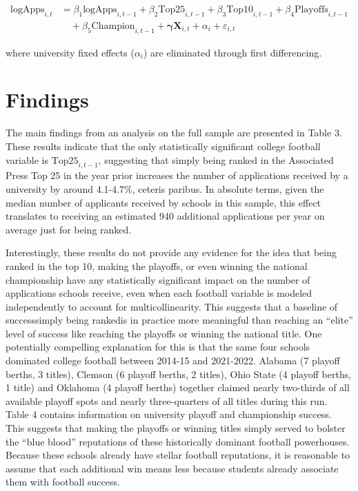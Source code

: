 \documentclass[12pt,english]{article}
\begin{document}
\begin{equation}
\begin{aligned}
    \text{logApps}_{i,t} &= \beta_1 \text{logApps}_{i,t-1} + \beta_2 \text{Top25}_{i,t-1} + \beta_3 \text{Top10}_{i,t-1} + \beta_4 \text{Playoffs}_{i,t-1} \\
    &\quad + \beta_5 \text{Champion}_{i,t-1} + \boldsymbol{\gamma}\mathbf{X}_{i,t}  + \alpha_i + \varepsilon_{i,t}
\end{aligned}
\end{equation}

where university fixed effects ($\alpha_i$) are eliminated through first differencing.

\section{Findings}

The main findings from an analysis on the full sample are presented in Table 3. These results indicate that the only statistically significant college football variable is $\text{Top25}_{i,t-1}$, suggesting that simply being ranked in the Associated Press Top 25 in the year prior increases the number of applications received by a university by around 4.1-4.7\%, ceteris paribus. In absolute terms, given the median number of applicants received by schools in this sample, this effect translates to receiving an estimated 940 additional applications per year on average just for being ranked.  

Interestingly, these results do not provide any evidence for the idea that being ranked in the top 10, making the playoffs, or even winning the national championship have any statistically significant impact on the number of applications schools receive, even when each football variable is modeled independently to account for multicollinearity. This suggests that a baseline of success\textemdash simply being ranked\textemdash is in practice more meaningful than reaching an “elite” level of success like reaching the playoffs or winning the national title. One potentially compelling explanation for this is that the same four schools dominated college football between 2014-15 and 2021-2022. Alabama (7 playoff berths, 3 titles), Clemson (6 playoff berths, 2 titles), Ohio State (4 playoff berths, 1 title) and Oklahoma (4 playoff berths) together claimed nearly two-thirds of all available playoff spots and nearly three-quarters of all titles during this run. Table 4 contains information on university playoff and championship success. This suggests that making the playoffs or winning titles simply served to bolster the “blue blood” reputations of these historically dominant football powerhouses. Because these schools already have stellar football reputations, it is reasonable to assume that each additional win means less because students already associate them with football success.
\end{document}
